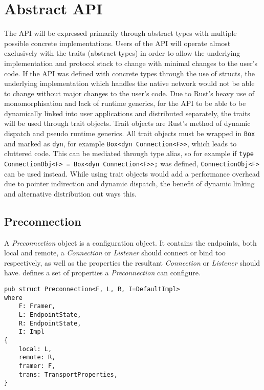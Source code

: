 \section{Abstract API}\label{sec:abstract-api}
The API will be expressed primarily through abstract types with multiple possible concrete implementations.
Users of the API will operate almost exclusively with the traits (abstract types) in order to allow the underlying
implementation and protocol stack to change with minimal changes to the user's code.
If the API was defined with concrete types through the use of structs, the underlying implementation which handles
the native network would not be able to change without major changes to the user's code.
Due to Rust's heavy use of monomorphisation and lack of runtime generics, for the API to be able to be dynamically
linked into user applications and distributed separately, the traits will be used through trait objects.
Trait objects are Rust's method of dynamic dispatch and pseudo runtime generics.
All trait objects must be wrapped in \texttt{Box} and marked as \texttt{dyn}, for example
\texttt{Box<dyn Connection<F>>}, which leads to cluttered code.
This can be mediated through type alias, so for example if \texttt{type ConnectionObj<F> = Box<dyn Connection<F>>;} was
defined, \texttt{ConnectionObj<F>} can be used instead.
While using trait objects would add a performance overhead due to pointer indirection and dynamic dispatch, the benefit
of dynamic linking and alternative distribution out ways this.

\subsection{Preconnection}\label{subsec:preconnection}
A \emph{Preconnection} object is a configuration object.
It contains the endpoints, both local and remote, a \emph{Connection} or \emph{Listener} should connect or bind too
respectively, as well as the properties the resultant \emph{Connection} or \emph{Listener} should have.
\cite[§~5.2]{trammell_abstractapplicationlayer_2019} defines a set of properties a \emph{Preconnection} can
configure.

\begin{lstlisting}[float=h, label=lst:preconnection, caption={The Preconnection struct, showing the four
generic parameters.}]
pub struct Preconnection<F, L, R, I=DefaultImpl>
where
    F: Framer,
    L: EndpointState,
    R: EndpointState,
    I: Impl
{
    local: L,
    remote: R,
    framer: F,
    trans: TransportProperties,
}
\end{lstlisting}

